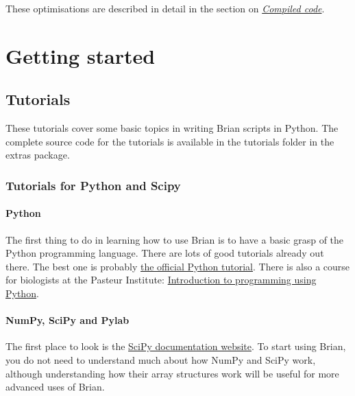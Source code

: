 \documentclass[letterpaper,10pt,english]{manual}
\begin{document}
These optimisations are described in detail in the section on \hyperlink{compiled-code}{\emph{Compiled code}}.

\resetcurrentobjects
\hypertarget{--doc-slowstart}{}

\chapter{Getting started}

\resetcurrentobjects
\hypertarget{--doc-tutorials}{}

\section{Tutorials}

These tutorials cover some basic topics in writing Brian scripts in Python. The
complete source code for the tutorials is available in the tutorials folder
in the extras package.

\resetcurrentobjects
\hypertarget{--doc-othertutorials}{}

\subsection{Tutorials for Python and Scipy}


\subsubsection{Python}

The first thing to do in learning how to use Brian
is to have a basic grasp of the Python programming language.
There are lots of good tutorials already out there. The best one is probably
\href{http://docs.python.org/tut/}{the official Python tutorial}.
There is also a course for biologists at the Pasteur Institute:
\href{http://www.pasteur.fr/formation/infobio/python/}{Introduction to programming using Python}.


\subsubsection{NumPy, SciPy and Pylab}

The first place to look is the \href{http://docs.scipy.org/doc/}{SciPy documentation website}. To start using Brian, you do not need
to understand much about how NumPy and SciPy work, although understanding how their
array structures work will be useful for more advanced uses of Brian.
\end{document}
